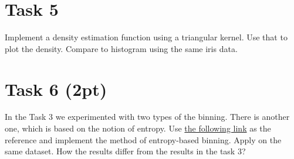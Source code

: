 \documentclass{article}
\begin{document}
\section*{Task 5}

Implement a density estimation function using a triangular kernel. Use that to plot the density. Compare to histogram using the same iris data. 

\section*{Task 6 (2pt)}
In the Task 3 we experimented with two types of the binning. There is another one, which is based on the notion of entropy. Use  \href{http://www.saedsayad.com/supervised_binning.htm}{the following link} as the reference and implement the method of entropy-based binning. Apply on the same dataset. How the results differ from the results in the task 3?
\end{document}

